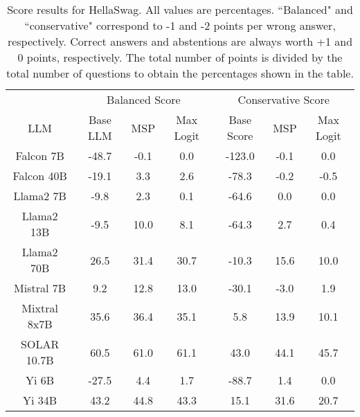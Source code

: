 \renewcommand\arraystretch{1.2}
\begin{table*}
\centering
\begin{tabular}{c|c|c|c|c|c|c}
& \multicolumn{3}{c|}{Balanced Score} & \multicolumn{3}{c}{Conservative Score} \\ 
LLM & Base LLM & MSP & Max Logit & Base Score & MSP & Max Logit\\ \hline
Falcon 7B & -48.7 & -0.1 & 0.0 & -123.0 & -0.1 & 0.0\\
Falcon 40B & -19.1 & 3.3 & 2.6 & -78.3 & -0.2 & -0.5\\
Llama2 7B & -9.8 & 2.3 & 0.1 & -64.6 & 0.0 & 0.0\\
Llama2 13B & -9.5 & 10.0 & 8.1 & -64.3 & 2.7 & 0.4\\
Llama2 70B & 26.5 & 31.4 & 30.7 & -10.3 & 15.6 & 10.0\\
Mistral 7B & 9.2 & 12.8 & 13.0 & -30.1 & -3.0 & 1.9\\
Mixtral 8x7B & 35.6 & 36.4 & 35.1 & 5.8 & 13.9 & 10.1\\
SOLAR 10.7B & 60.5 & 61.0 & 61.1 & 43.0 & 44.1 & 45.7\\
Yi 6B & -27.5 & 4.4 & 1.7 & -88.7 & 1.4 & 0.0\\
Yi 34B & 43.2 & 44.8 & 43.3 & 15.1 & 31.6 & 20.7\\
\hline
\end{tabular}
\caption{Score results for HellaSwag. All values are percentages. ``Balanced" and ``conservative" correspond to -1 and -2 points per wrong answer, respectively. Correct answers and abstentions are always worth +1 and 0 points, respectively. The total number of points is divided by the total number of questions to obtain the percentages shown in the table.}
\label{tab:hellaswag_score}
\end{table*}
